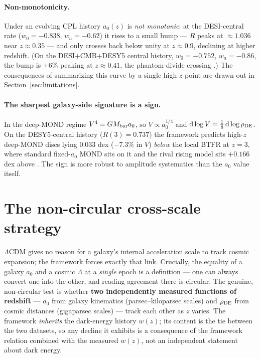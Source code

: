 \documentclass[11pt,a4paper]{article}
\newcommand{\rhoDE}{\rho_{\rm DE}}
\newcommand{\azero}{a_0}
\begin{document}
\paragraph{Non-monotonicity.} Under an evolving CPL history $\azero(z)$ is
\emph{not monotonic}: at the DESI-central rate
($w_0=-0.838$, $w_a=-0.62$) it rises to a small bump --- $R$ peaks at
$\approx1.036$ near $z\approx0.35$ --- and only crosses back below unity at
$z\approx0.9$, declining at higher redshift. (On the DESI+CMB+DESY5 central
history, $w_0=-0.752$, $w_a=-0.86$, the bump is $+6\%$ peaking at
$z\approx0.41$, the phantom-divide crossing \cite{Zdesi}.) The consequences of
summarizing this curve by a single high-$z$ point are drawn out in
Section~\ref{sec:limitations}.

\paragraph{The sharpest galaxy-side signature is a sign.} In the deep-MOND
regime $V^4=GM_{\rm bar}\azero$, so $V\propto \azero^{1/4}$ and
${\rm d}\log V=\tfrac18\,{\rm d}\log\rhoDE$. On the DESY5-central history
($R(3)=0.737$) the framework predicts high-$z$ deep-MOND discs lying $0.033$
dex ($-7.3\%$ in $V$) \emph{below} the local BTFR at $z=3$, where standard
fixed-$\azero$ MOND sits on it and the rival rising model sits $+0.166$ dex
above \cite{Zdesi}. The sign is more robust to amplitude systematics than the
$\azero$ value itself.

\section{The non-circular cross-scale strategy}
\label{sec:noncircular}

$\Lambda$CDM gives no reason for a galaxy's internal acceleration scale to
track cosmic expansion; the framework forces exactly that link. Crucially, the
equality of a galaxy $\azero$ and a cosmic $\Lambda$ at a \emph{single} epoch
is a definition --- one can always convert one into the other, and reading
agreement there is circular. The genuine, non-circular test is whether
\textbf{two independently measured functions of redshift} --- $\azero$ from
galaxy kinematics (parsec--kiloparsec scales) and $\rhoDE$ from cosmic
distances (gigaparsec scales) --- track each other as $z$ varies. The
framework \emph{inherits} the dark-energy history $w(z)$; its content is the
tie between the two datasets, so any decline it exhibits is a consequence of
the framework relation combined with the measured $w(z)$, not an independent
statement about dark energy.
\end{document}
